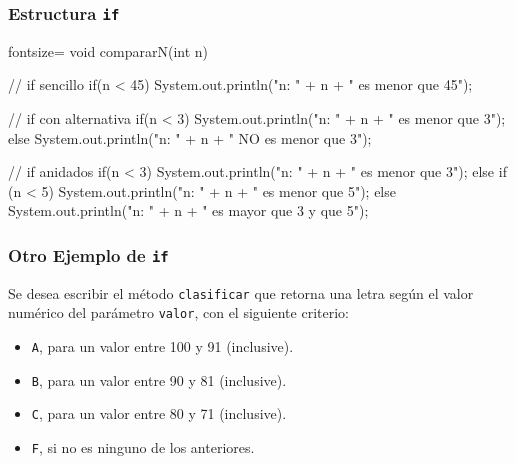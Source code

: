\documentclass{beamer}
\newcommand{\code}[1]{\texttt{#1}}
\begin{document}
\begin{frame}[fragile]
  \frametitle{Estructura \code{if}}
\begin{jsmall*}{fontsize=\scriptsize}
    void compararN(int n) {
      // if sencillo
      if(n < 45) {
        System.out.println("n: " + n + " es menor que 45");
      }

      // if con alternativa
      if(n < 3) {
        System.out.println("n: " + n + " es menor que 3");
      } else {
        System.out.println("n: " + n + " NO es menor que 3");
      }

      // if anidados
      if(n < 3) {
        System.out.println("n: " + n + " es menor que 3");
      } else if (n < 5) {
        System.out.println("n: " + n + " es menor que 5");
      } else {
        System.out.println("n: " + n + " es mayor que 3 y que 5");
      }
    }
\end{jsmall*}
\end{frame}      


\begin{frame}
  \frametitle{Otro Ejemplo de \code{if}}

  Se desea escribir el método \code{clasificar} que retorna una
  letra según el valor numérico del parámetro \code{valor}, con el
  siguiente criterio:
  
  \begin{itemize}
  \item \code{A}, para un valor entre 100 y 91 (inclusive).
  \item \code{B}, para un valor entre 90 y 81 (inclusive).
  \item \code{C}, para un valor entre 80 y 71 (inclusive).
  \item \code{F}, si no es ninguno de los anteriores.
  \end{itemize}

\end{frame}
\end{document}
